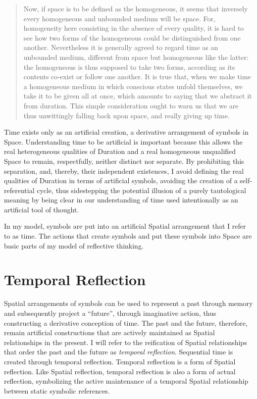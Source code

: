 \begin{quote}
Now, if space is to be defined as the homogeneous, it seems that
inversely every homogeneous and unbounded medium will be space.  For,
homogeneity here consisting in the absence of every quality, it is
hard to see how two forms of the homogeneous could be distinguished
from one another.  Nevertheless it is generally agreed to regard time
as an unbounded medium, different from space but homogeneous like the
latter: the homogeneous is thus supposed to take two forms, according
as its contents co-exist or follow one another.  It is true that, when
we make time a homogeneous medium in which conscious states unfold
themselves, we take it to be given all at once, which amounts to
saying that we abstract it from duration.  This simple consideration
ought to warn us that we are thus unwittingly falling back upon space,
and really giving up time.
\end{quote}

Time exists only as an artificial creation, a derivative arrangement
of symbols in Space.  Understanding time to be artificial is important
because this allows the real heterogeneous qualities of Duration and a
real homogeneous unqualified Space to remain, respectfully, neither
distinct nor separate.  By prohibiting this separation, and, thereby,
their independent existences, I avoid defining the real qualities of
Duration in terms of artificial symbols, avoiding the creation of a
self-referential cycle, thus sidestepping the potential illusion of a
purely tautological meaning by being clear in our understanding of
time used intentionally as an artificial tool of thought.

In my model, symbols are put into an artificial Spatial arrangement
that I refer to as time.  The actions that create symbols and put
these symbols into Space are basic parts of my model of reflective
thinking.

\section{Temporal Reflection}

Spatial arrangements of symbols can be used to represent a past
through memory and subsequently project a ``future'', through
imaginative action, thus constructing a derivative conception of time.
The past and the future, therefore, remain artificial constructions
that are actively maintained as Spatial relationships in the present.
I will refer to the reification of Spatial relationships that order
the past and the future as \emph{temporal reflection}.  Sequential
time is created through temporal reflection.  Temporal reflection is a
form of Spatial reflection.  Like Spatial reflection, temporal
reflection is also a form of actual reflection, symbolizing the active
maintenance of a temporal Spatial relationship between static symbolic
references.

